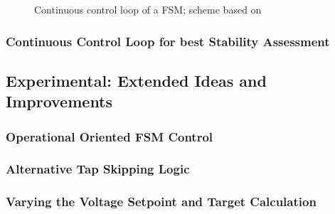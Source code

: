 \begin{figure}[htb!]
        \centering
        \caption{Continuous control loop of a \acs{FSM}; scheme based on \textcite{burlakinEnhancedVoltageControl2024}}
        \label{fig:fsm-continuous-control-loop}
\end{figure}

\subsubsection{Continuous Control Loop for best Stability Assessment}

\subsection{Experimental: Extended Ideas and Improvements}

\subsubsection{Operational Oriented FSM Control}

\subsubsection{Alternative Tap Skipping Logic}

\subsubsection{Varying the Voltage Setpoint and Target Calculation}




